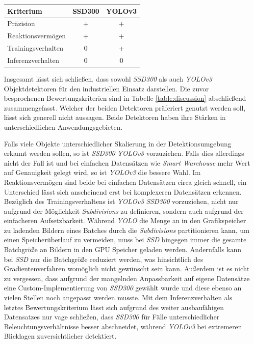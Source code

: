 \begin{center}
	\begin{tabular}[h]{l|c|c}
		Kriterium & SSD300 & YOLOv3 \\
		\hline
		Präzision & + & + \\
		Reaktionsvermögen & + & + \\
		Trainingsverhalten & 0 & + \\
		Inferenzverhalten & 0 & 0 \\
	\end{tabular}
	\label{table:discussion}
\end{center}

Insgesamt lässt sich schließen, dass sowohl \textit{SSD300} als auch \textit{YOLOv3} Objektdetektoren für den industriellen Einsatz darstellen. Die zuvor besprochenen Bewertungskriterien sind in Tabelle \ref{table:discussion} abschließend zusammengefasst. Welcher der beiden Detektoren präferiert genutzt werden soll, lässt sich generell nicht aussagen. Beide Detektoren haben ihre Stärken in unterschiedlichen Anwendungsgebieten. 

Falls viele Objekte unterschiedlicher Skalierung in der Detektionsumgebung erkannt werden sollen, so ist \textit{SSD300} \textit{YOLOv3} vorzuziehen. Falls dies allerdings nicht der Fall ist und bei einfachen Datensätzen wie \textit{Smart Warehouse} mehr Wert auf Genauigkeit gelegt wird, so ist \textit{YOLOv3} die bessere Wahl. Im Reaktionsvermögen sind beide bei einfachen Datensätzen circa gleich schnell, ein Unterschied lässt sich anscheinend erst bei komplexeren Datensätzen erkennen. Bezüglich des Trainingsverhaltens ist \textit{YOLOv3} \textit{SSD300} vorzuziehen, nicht nur aufgrund der Möglichkeit \textit{Subdivisions} zu definieren, sondern auch aufgrund der einfacheren Aufsetzbarkeit. Während \textit{YOLO} die Menge an in den Grafikspeicher zu ladenden Bildern eines Batches durch die \textit{Subdivisions} partitionieren kann, um einen Speicherüberlauf zu vermeiden, muss bei \textit{SSD} hingegen immer die gesamte Batchgröße an Bildern in den GPU Speicher geladen werden. Andernfalls kann bei \textit{SSD} nur die Batchgröße reduziert werden, was hinsichtlich des Gradientenverfahren womöglich nicht gewünscht sein kann. Außerdem ist es nicht zu vergessen, dass aufgrund der mangelnden Anpassbarkeit auf eigene Datensätze eine Custom-Implementierung von \textit{SSD300} gewählt wurde und diese ebenso an vielen Stellen noch angepasst werden musste. Mit dem Inferenzverhalten als letztes Bewertungskriterium lässt sich aufgrund des weiter ausbaufähigen Datensatzes nur vage schließen, dass \textit{SSD300} für Fälle unterschiedlicher Beleuchtungsverhältnisse besser abschneidet, während \textit{YOLOv3} bei extremeren Blicklagen zuversichtlicher detektiert. 


